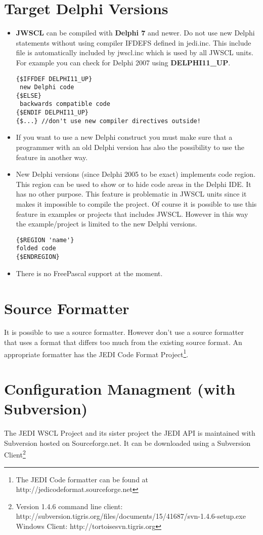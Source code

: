 \documentclass[a4paper,oneside,10pt]{article}
\begin{document}
\section{Target Delphi Versions}
\begin{itemize}
	\item \textbf{JWSCL} can be compiled with \textbf{Delphi 7} and newer. Do not use new Delphi statements without using compiler IFDEFS defined in jedi.inc. This include file is automatically included by jwscl.inc which is used by all JWSCL units. For example you can check for Delphi 2007 using \textbf{DELPHI11\_UP}.
\begin{lstlisting} 
{$IFFDEF DELPHI11_UP}
 new Delphi code
{$ELSE}
 backwards compatible code
{$ENDIF DELPHI11_UP}
{$...} //don't use new compiler directives outside!
\end{lstlisting}  
\item If you want to use a new Delphi construct you must make sure that a programmer with an old Delphi version has also the possibility to use the feature in another way.
\item New Delphi versions (since Delphi 2005 to be exact) implements code region. This region can be used to show or to hide code areas in the Delphi IDE. It has no other purpose. This feature is problematic in JWSCL units since it makes it impossible to compile the project. Of course it is possible to use this feature in examples or projects that includes JWSCL. However in this way the example/project is limited to the new Delphi versions.

\begin{lstlisting}
{$REGION 'name'}
folded code    
{$ENDREGION}
\end{lstlisting}

\item There is no FreePascal support at the moment.
\end{itemize}

\section{Source Formatter}
It is possible to use a source formatter. However don't use a source formatter that uses a format that differs too much from the existing source format. An appropriate formatter has the JEDI Code Format Project\footnote{The JEDI Code formatter can be found at http://jedicodeformat.sourceforge.net}.

\section{Configuration Managment (with Subversion)}
The JEDI WSCL Project and its sister project the JEDI API is maintained with Subversion hosted on Sourceforge.net.
It can be downloaded using a Subversion Client\footnote{Version 1.4.6 command line client: http://subversion.tigris.org/files/documents/15/41687/svn-1.4.6-setup.exe\\Windows Client: http://tortoisesvn.tigris.org}
\end{document}
